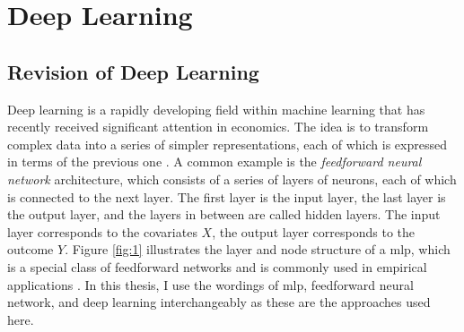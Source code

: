 \section{Deep Learning}

\subsection{Revision of Deep Learning}
Deep learning is a rapidly developing field within machine learning that has recently received significant attention in economics.
The idea is to transform complex data into a series of simpler representations, each of which is expressed in terms of the previous one \citep{Goodfellow-et-al-2016}.
A common example is the \textit{feedforward neural network} architecture, which consists of a series of layers of neurons, each of which is connected to the next layer.
The first layer is the input layer, the last layer is the output layer, and the layers in between are called hidden layers.
The input layer corresponds to the covariates $X$, the output layer corresponds to the outcome $Y$.
Figure \ref{fig:1} illustrates the layer and node structure of a \ac{mlp}, which is a special class of feedforward networks and is commonly used in empirical applications \citep{farrellDeepNeuralNetworks2021}.
In this thesis, I use the wordings of \ac{mlp}, feedforward neural network, and deep learning interchangeably as these are the approaches used here.

